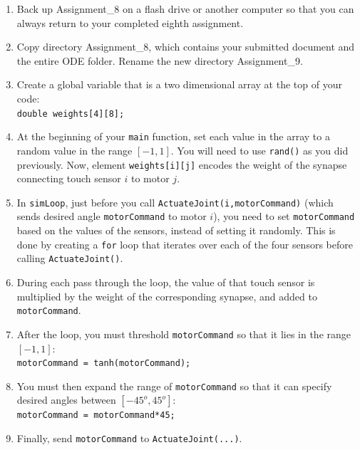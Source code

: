 \documentclass[12pt]{article}
\begin{document}
\begin{enumerate}

\item Back up Assignment\_8 on a flash drive or another computer so that you can always return to your completed eighth assignment.

\item Copy directory Assignment\_8, which contains your submitted document and the entire ODE folder. Rename the new directory Assignment\_9.

\item Create a global variable that is a two dimensional array at the top of your code:\\
    \texttt{double weights[4][8];}

\item At the beginning of your \texttt{main} function, set each value in the array to a random value in the range $[-1,1]$. You will need to use \texttt{rand()} as you did previously. Now, element \texttt{weights[i][j]} encodes the weight of the synapse connecting touch sensor $i$ to motor $j$.

\item In \texttt{simLoop}, just before you call \texttt{ActuateJoint(i,motorCommand)} (which sends desired angle \texttt{motorCommand} to motor $i$), you need to set \texttt{motorCommand} based on the values of the sensors, instead of setting it randomly. This is done by creating a \texttt{for} loop that iterates over each of the four sensors before calling \texttt{ActuateJoint()}.

\item During each pass through the loop, the value of that touch sensor is multiplied by the weight of the corresponding synapse, and added to \texttt{motorCommand}.

\item After the loop, you must threshold \texttt{motorCommand} so that it lies in the range $[-1,1]$:\\
    \texttt{motorCommand = tanh(motorCommand);}

\item You must then expand the range of \texttt{motorCommand} so that it can specify desired angles between $[-45^o,45^o]$: \\
    \texttt{motorCommand = motorCommand*45;}

\item Finally, send \texttt{motorCommand} to \texttt{ActuateJoint(...)}.


\end{enumerate}
\end{document}
